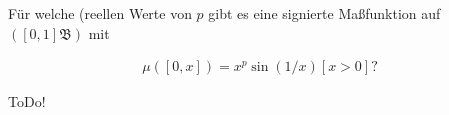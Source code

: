 
\begin{exercise}

Für welche (reellen Werte von $p$ gibt es eine signierte Maßfunktion auf $([0, 1] \mathfrak B)$ mit

\begin{align*}
    \mu([0, x])
    =
    x^p \sin(1/x) [x > 0]?
\end{align*}

\end{exercise}


\begin{solution}

ToDo!

\end{solution}

